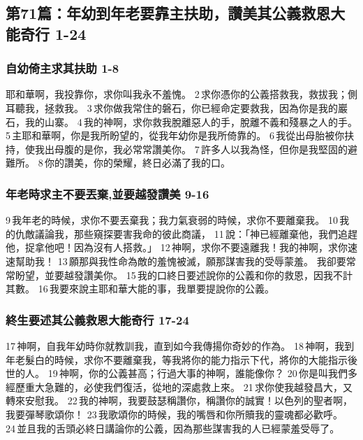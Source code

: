 \subsection{第71篇：年幼到年老要靠主扶助，讚美其公義救恩大能奇行 1-24}
\subsubsection{自幼倚主求其扶助 1-8}
耶和華啊，我投靠你，求你叫我永不羞愧。
2 求你憑你的公義搭救我，救拔我；側耳聽我，拯救我。
3 求你做我常住的磐石，你已經命定要救我，因為你是我的巖石，我的山寨。
4 我的神啊，求你救我脫離惡人的手，脫離不義和殘暴之人的手。
5 主耶和華啊，你是我所盼望的，從我年幼你是我所倚靠的。
6 我從出母胎被你扶持，使我出母腹的是你，我必常常讚美你。
7 許多人以我為怪，但你是我堅固的避難所。
8 你的讚美，你的榮耀，終日必滿了我的口。
\subsubsection{年老時求主不要丟棄,並要越發讚美 9-16}
9 我年老的時候，求你不要丟棄我；我力氣衰弱的時候，求你不要離棄我。
10 我的仇敵議論我，那些窺探要害我命的彼此商議，
11 說：「神已經離棄他，我們追趕他，捉拿他吧！因為沒有人搭救。」
12 神啊，求你不要遠離我！我的神啊，求你速速幫助我！
13 願那與我性命為敵的羞愧被滅，願那謀害我的受辱蒙羞。
我卻要常常盼望，並要越發讚美你。
15 我的口終日要述說你的公義和你的救恩，因我不計其數。
16 我要來說主耶和華大能的事，我單要提說你的公義。

\subsubsection{終生要述其公義救恩大能奇行 17-24}
17 神啊，自我年幼時你就教訓我，直到如今我傳揚你奇妙的作為。
18 神啊，我到年老髮白的時候，求你不要離棄我，等我將你的能力指示下代，將你的大能指示後世的人。
19 神啊，你的公義甚高；行過大事的神啊，誰能像你？
20 你是叫我們多經歷重大急難的，必使我們復活，從地的深處救上來。
21 求你使我越發昌大，又轉來安慰我。
22 我的神啊，我要鼓瑟稱讚你，稱讚你的誠實！以色列的聖者啊，我要彈琴歌頌你！
23 我歌頌你的時候，我的嘴唇和你所贖我的靈魂都必歡呼。
24 並且我的舌頭必終日講論你的公義，因為那些謀害我的人已經蒙羞受辱了。

